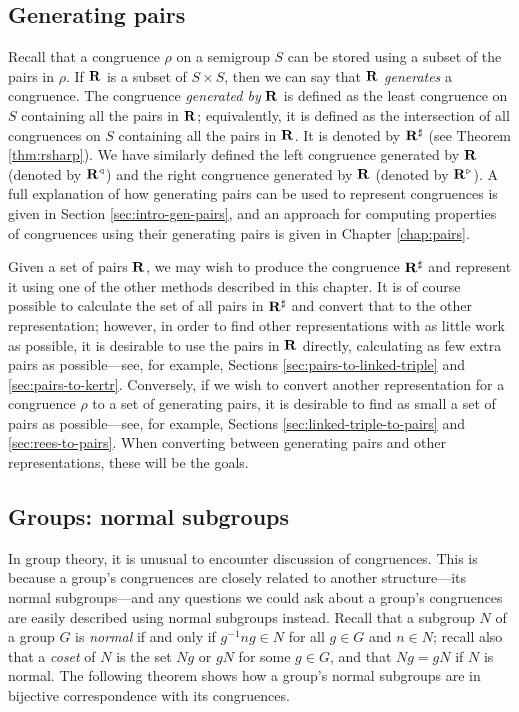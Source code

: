 \subsection{Generating pairs}
\label{sec:converting-pairs}
Recall that a congruence $\rho$ on a semigroup $S$ can be stored using
a subset of the pairs in $\rho$.  If $\mathbf{R}$ is a subset of $S \times S$,
then we can say that $\mathbf{R}$ \textit{generates} a congruence.  The
congruence \textit{generated by} $\mathbf{R}$ is defined as the least congruence
on $S$ containing all the pairs in $\mathbf{R}$; equivalently, it is defined as
the intersection of all congruences on $S$ containing all the pairs in
$\mathbf{R}$.  It is denoted by $\mathbf{R}^\sharp$ (see Theorem
\ref{thm:rsharp}).  We have similarly defined the left congruence generated by
$\mathbf{R}$ (denoted by $\mathbf{R}^\triangleleft$) and the right congruence
generated by $\mathbf{R}$ (denoted by $\mathbf{R}^\triangleright$).
A full explanation of how generating pairs can be used to represent congruences
is given in Section \ref{sec:intro-gen-pairs}, and an approach for computing
properties of congruences using their generating pairs is given in Chapter
\ref{chap:pairs}.

Given a set of pairs $\mathbf{R}$, we may wish to produce the congruence
$\mathbf{R}^\sharp$ and represent it using one of the other methods described in
this chapter.  It is of course possible to calculate the set of all pairs in
$\mathbf{R}^\sharp$ and convert that to the other representation; however, in
order to find other representations with as little work as possible, it is
desirable to use the pairs in $\mathbf{R}$ directly, calculating as few extra
pairs as possible---see, for example, Sections \ref{sec:pairs-to-linked-triple}
and \ref{sec:pairs-to-kertr}.  Conversely, if we wish to convert another
representation for a congruence $\rho$ to a set of generating pairs, it is
desirable to find as small a set of pairs as possible---see, for example,
Sections \ref{sec:linked-triple-to-pairs} and \ref{sec:rees-to-pairs}.  When
converting between generating pairs and other representations, these will be the
goals.

\subsection{Groups: normal subgroups}
\label{sec:normal-subgroups}

In group theory, it is unusual to encounter discussion of congruences.  This is
because a group's congruences are closely related to another structure---its
normal subgroups---and any questions we could ask about a group's congruences are
easily described using normal subgroups instead.  Recall that a subgroup $N$ of
a group $G$ is \textit{normal} if and only if $g^{-1}ng \in N$ for all $g \in G$
and $n \in N$; recall also that a \textit{coset} of $N$ is the set $Ng$ or $gN$
for some $g \in G$, and that $Ng=gN$ if $N$ is normal.  The following theorem
shows how a group's normal subgroups are in bijective correspondence with its
congruences.

